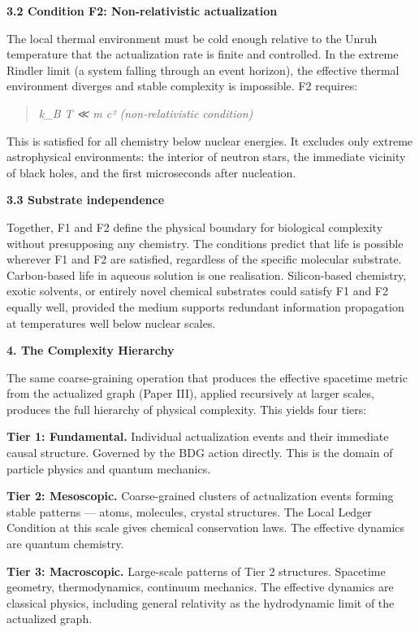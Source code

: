 \documentclass[12pt,a4paper]{article}
\begin{document}
\textbf{3.2 Condition F2: Non-relativistic actualization}

The local thermal environment must be cold enough relative to the Unruh
temperature that the actualization rate is finite and controlled. In the
extreme Rindler limit (a system falling through an event horizon), the
effective thermal environment diverges and stable complexity is
impossible. F2 requires:

\begin{quote}
\emph{k\_B T ≪ m c² (non-relativistic condition)}
\end{quote}

This is satisfied for all chemistry below nuclear energies. It excludes
only extreme astrophysical environments: the interior of neutron stars,
the immediate vicinity of black holes, and the first microseconds after
nucleation.

\textbf{3.3 Substrate independence}

Together, F1 and F2 define the physical boundary for biological
complexity without presupposing any chemistry. The conditions predict
that life is possible wherever F1 and F2 are satisfied, regardless of
the specific molecular substrate. Carbon-based life in aqueous solution
is one realisation. Silicon-based chemistry, exotic solvents, or
entirely novel chemical substrates could satisfy F1 and F2 equally well,
provided the medium supports redundant information propagation at
temperatures well below nuclear scales.

\textbf{4. The Complexity Hierarchy}

The same coarse-graining operation that produces the effective spacetime
metric from the actualized graph (Paper III), applied recursively at
larger scales, produces the full hierarchy of physical complexity. This
yields four tiers:

\textbf{Tier 1: Fundamental.} Individual actualization events and their
immediate causal structure. Governed by the BDG action directly. This is
the domain of particle physics and quantum mechanics.

\textbf{Tier 2: Mesoscopic.} Coarse-grained clusters of actualization
events forming stable patterns --- atoms, molecules, crystal structures.
The Local Ledger Condition at this scale gives chemical conservation
laws. The effective dynamics are quantum chemistry.

\textbf{Tier 3: Macroscopic.} Large-scale patterns of Tier 2 structures.
Spacetime geometry, thermodynamics, continuum mechanics. The effective
dynamics are classical physics, including general relativity as the
hydrodynamic limit of the actualized graph.
\end{document}
